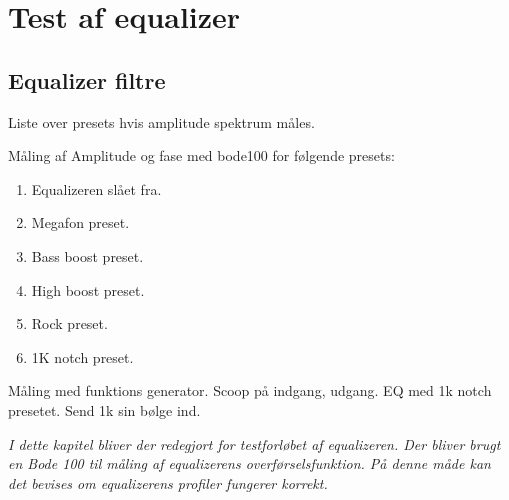 \chapter{Test af equalizer}\label{sec:test_eq}

\section{Equalizer filtre}


Liste over presets hvis amplitude spektrum måles.

Måling af Amplitude og fase med bode100 for følgende presets:
\begin{enumerate}
    \item Equalizeren slået fra.
    \item Megafon preset.
    \item Bass boost preset.
    \item High boost preset.
    \item Rock preset. 
    \item 1K notch preset.
\end{enumerate}



Måling med funktions generator. Scoop på indgang, udgang.
EQ med 1k notch presetet. 
Send 1k sin bølge ind. 

\emph{I dette kapitel bliver der redegjort for testforløbet af equalizeren. Der bliver brugt en Bode 100 til måling af equalizerens overførselsfunktion. På denne måde kan det bevises om equalizerens profiler fungerer korrekt.}

